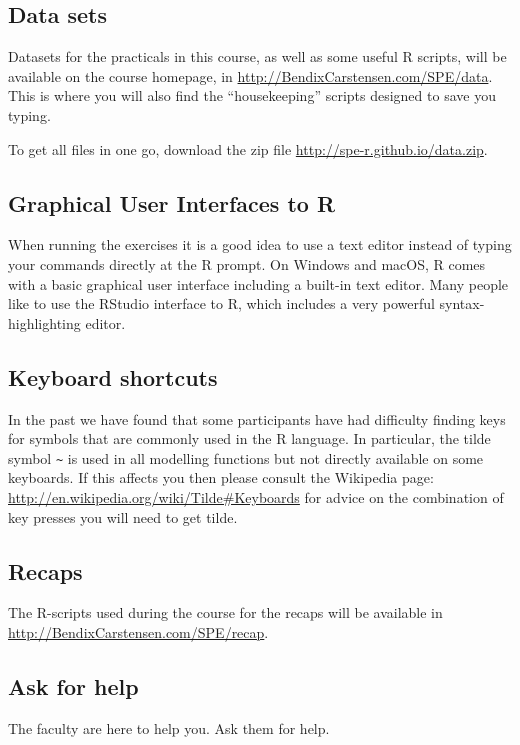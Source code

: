 
\subsection*{Data sets}

Datasets for the practicals in this course, as well as some useful R
scripts, will be available on the course homepage, in
\url{http://BendixCarstensen.com/SPE/data}. This is where you will
also find the ``housekeeping'' scripts designed to save you typing.

To get all files in one go, download the zip
file \url{http://spe-r.github.io/data.zip}.

\subsection*{Graphical User Interfaces to R}

When running the exercises it is a good idea to use a text editor
instead of typing your commands directly at the R prompt. On Windows
and macOS, R comes with a basic graphical user interface including a
built-in text editor. Many people like to use the RStudio interface to
R, which includes a very powerful syntax-highlighting editor.

\subsection*{Keyboard shortcuts}

In the past we have found that some participants have had difficulty
finding keys for symbols that are commonly used in the R language.  In
particular, the tilde symbol \verb+~+ is used in all modelling
functions but not directly available on some keyboards. If this
affects you then please consult the Wikipedia
page: \url{http://en.wikipedia.org/wiki/Tilde#Keyboards} for advice on
the combination of key presses you will need to get tilde.

\subsection*{Recaps}
The R-scripts used during the course for the recaps will be available
in \url{http://BendixCarstensen.com/SPE/recap}.

\subsection*{Ask for help}

The faculty are here to help you. Ask them for help.


